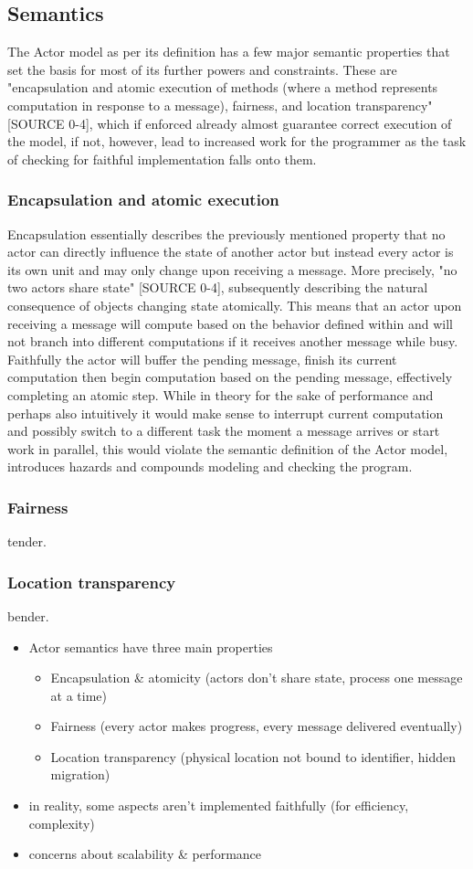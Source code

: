 \documentclass[A4]{article}
\begin{document}
\subsection{Semantics}
The Actor model as per its definition has a few major semantic properties that set the basis for most of its further powers and constraints. These are "encapsulation and atomic execution of methods (where a method represents computation in response to a message), fairness, and location transparency" [SOURCE 0-4], which if enforced already almost guarantee correct execution of the model, if not, however, lead to increased work for the programmer as the task of checking for faithful implementation falls onto them. 
\subsubsection{Encapsulation and atomic execution}
Encapsulation essentially describes the previously mentioned property that no actor can directly influence the state of another actor but instead every actor is its own unit and may only change upon receiving a message. More precisely, "no two actors share state" [SOURCE 0-4], subsequently describing the natural consequence of objects changing state atomically. This means that an actor upon receiving a message will compute based on the behavior defined within and will not branch into different computations if it receives another message while busy. Faithfully the actor will buffer the pending message, finish its current computation then begin computation based on the pending message, effectively completing an atomic step. 
While in theory for the sake of performance and perhaps also intuitively it would make sense to interrupt current computation and possibly switch to a different task the moment a message arrives or start work in parallel, this would violate the semantic definition of the Actor model, introduces hazards and compounds modeling and checking the program. 
\subsubsection{Fairness}
tender.
\subsubsection{Location transparency}
bender.
\begin{itemize}
\item Actor semantics have three main properties
	\begin{itemize}
	\item Encapsulation \& atomicity
	(actors don't share state, process one message at a time)
	\item Fairness
	(every actor makes progress, every message delivered eventually)
	\item Location transparency
	(physical location not bound to identifier, hidden migration)
	\end{itemize}
\item in reality, some aspects aren't implemented faithfully (for efficiency, complexity)
\item concerns about scalability \& performance
\end{itemize}
\end{document}
